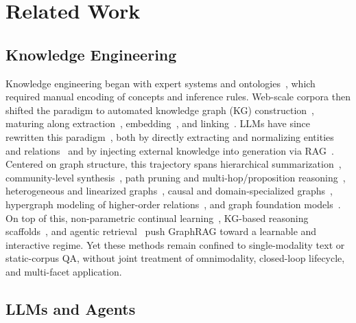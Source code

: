 \documentclass{article}
\begin{document}
\clearpage

\section{Related Work}

\subsection{Knowledge Engineering}

Knowledge engineering began with expert systems and ontologies~\citep{KEclassic, CYC, WordNet}, which required manual encoding of concepts and inference rules. Web-scale corpora then shifted the paradigm to automated knowledge graph (KG) construction~\citep{Freebase, DBpedia, YAGO, Wikidata}, maturing along extraction~\citep{NELL, OpenIE}, embedding~\citep{TransE, ComplexE}, and linking~\citep{BLINK, KG}. LLMs have since rewritten this paradigm~\citep{KGLLMsurvey}, both by directly extracting and normalizing entities and relations~\citep{LLMIEsurvey, KAG, OntoKG, iText2KG} and by injecting external knowledge into generation via RAG~\citep{RAG, RAGSurvey}. Centered on graph structure, this trajectory spans hierarchical summarization~\citep{RAPTOR}, community-level synthesis~\citep{GraphRAG, LightRAG}, path pruning and multi-hop/proposition reasoning~\citep{PathRAG, HopRAG, PropRAG, E2GraphRAG}, heterogeneous and linearized graphs~\citep{NodeRAG, LinearRAG}, causal and domain-specialized graphs~\citep{CausalRAG, MedGraphRAG, PIKE-RAG}, hypergraph modeling of higher-order relations~\citep{HyperGraphRAG, HyperRAG, EHRAG}, and graph foundation models~\citep{GFM-RAG, G-reasoner}. On top of this, non-parametric continual learning~\citep{HippoRAG2}, KG-based reasoning scaffolds~\citep{ToG}, and agentic retrieval~\citep{KBQA-o1, GraphSearch, Youtu-GraphRAG, AgenticRAGSurvey, Graph-R1} push GraphRAG toward a learnable and interactive regime. Yet these methods remain confined to single-modality text or static-corpus QA, without joint treatment of omnimodality, closed-loop lifecycle, and multi-facet application.

\subsection{LLMs and Agents}
\end{document}
